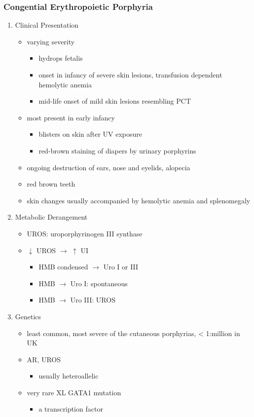 \documentclass{scrartcl}
\begin{document}
\subsubsection{Congential Erythropoietic Porphyria}
\label{sec:orgc4560e7}
\begin{enumerate}
\item Clinical Presentation
\label{sec:orgdf3cabb}
\begin{itemize}
\item varying severity
\begin{itemize}
\item hydrops fetalis
\item onset in infancy of severe skin lesions, transfusion dependent
hemolytic anemia
\item mid-life onset of mild skin lesions resembling PCT
\end{itemize}
\item most present in early infancy
\begin{itemize}
\item blisters on skin after UV exposure
\item red-brown staining of diapers by urinary porphyrins
\end{itemize}
\item ongoing destruction of ears, nose and eyelids, alopecia
\item red brown teeth
\item skin changes usually accompanied by hemolytic anemia and splenomegaly
\end{itemize}
\item Metabolic Derangement
\label{sec:org1b965b0}
\begin{itemize}
\item UROS: uroporphyrinogen III synthase
\item \(\downarrow\) UROS \(\to\) \(\uparrow\) UI
\begin{itemize}
\item HMB condensed \(\to\) Uro I or III
\item HMB \(\rightarrow\) Uro I: spontaneous
\item HMB \(\rightarrow\) Uro III: UROS
\end{itemize}
\end{itemize}
\item Genetics
\label{sec:org9f906a4}
\begin{itemize}
\item least common, most severe of the cutaneous porphyrias, < 1:million in UK
\item AR, UROS
\begin{itemize}
\item usually heteroallelic
\end{itemize}
\item very rare XL GATA1 mutation
\begin{itemize}
\item a transcription factor
\end{itemize}
\end{itemize}


\end{enumerate}
\end{document}
